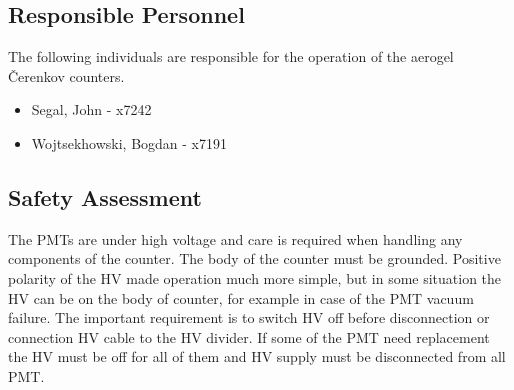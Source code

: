 \subsection{Responsible Personnel} 
The following individuals are responsible for the operation 
of the aerogel \v{C}erenkov counters.
 
\begin{itemize}
\item[~]Segal, John - x7242 
\item[~]Wojtsekhowski, Bogdan - x7191 
\end{itemize} 

\subsection{Safety Assessment}

\begin{safetyen}{10}{10}
The PMTs are under high voltage and care is required when handling any 
components of the counter. The body of the counter must be grounded.
Positive polarity of the HV made operation much more simple, but in some
situation the HV can be on the body of counter, for example in case of 
the PMT vacuum failure.
The important requirement is to switch HV off before disconnection or 
connection HV cable to the HV divider. If some of the PMT need replacement the 
HV must be off for all of them and HV supply must be disconnected 
from all PMT.
\end{safetyen}


